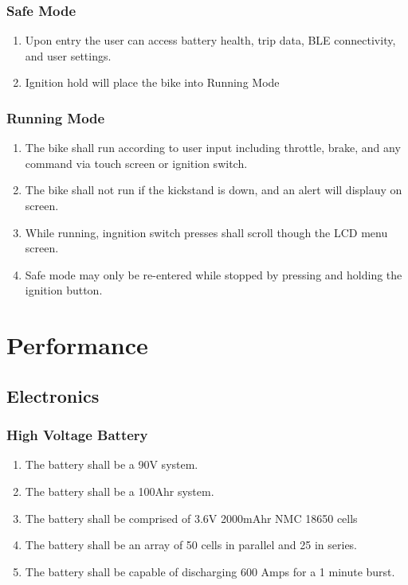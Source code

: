 \documentclass[12pt compsoc]{article}
\begin{document}
\subsubsection{Safe Mode}
\begin{enumerate}
\item Upon entry the user can access battery health, trip data, BLE connectivity, and user settings.
\item Ignition hold will place the bike into Running Mode
\end{enumerate}

\subsubsection{Running Mode}
\begin{enumerate}
\item The bike shall run according to user input including throttle, brake, and any command via touch screen or ignition switch.
\item The bike shall not run if the kickstand is down, and an alert will displauy on screen.
\item While running, ingnition switch presses shall scroll though the LCD menu screen.
\item Safe mode may only be re-entered while stopped by pressing and holding the ignition button.
\end{enumerate}

\section{Performance}
\subsection{Electronics}
\subsubsection{High Voltage Battery}
\begin{enumerate}
\item The battery shall be a 90V system.
\item The battery shall be a 100Ahr system.
\item The battery shall be comprised of 3.6V 2000mAhr NMC 18650 cells
\item The battery shall be an array of 50 cells in parallel and 25 in series.
\item The battery shall be capable of discharging 600 Amps for a 1 minute burst.
\end{enumerate}
\end{document}
